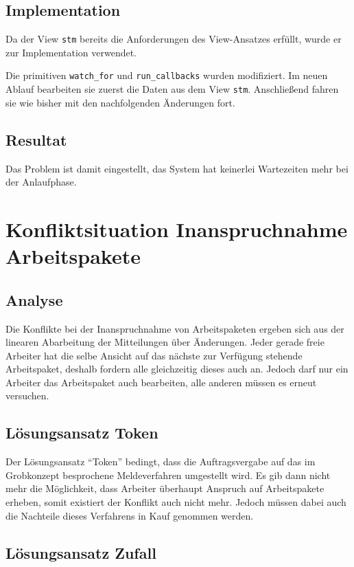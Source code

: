 \subsection{Implementation}
Da der View \verb|stm| bereits die Anforderungen des View-Ansatzes erfüllt,
wurde er zur Implementation verwendet.

Die primitiven \verb|watch_for| und \verb|run_callbacks| wurden modifiziert.
Im neuen Ablauf bearbeiten sie zuerst die Daten aus dem View \verb|stm|.
Anschließend fahren sie wie bisher mit den nachfolgenden Änderungen fort.

\subsection{Resultat}
Das Problem ist damit eingestellt, das System hat keinerlei Wartezeiten mehr bei der Anlaufphase.


\section{Konfliktsituation Inanspruchnahme Arbeitspakete}
\label{cha:opt:conflict-claim}
\subsection{Analyse}
Die Konflikte bei der Inanspruchnahme von Arbeitspaketen ergeben sich aus der linearen Abarbeitung der Mitteilungen über Änderungen.
Jeder gerade freie Arbeiter hat die selbe Ansicht auf das nächste zur Verfügung stehende Arbeitspaket, deshalb fordern alle gleichzeitig dieses auch an.
Jedoch darf nur ein Arbeiter das Arbeitspaket auch bearbeiten,
alle anderen müssen es erneut versuchen.

\subsection{Lösungsansatz Token}
Der Lösungsansatz ``Token'' bedingt, dass die Auftragsvergabe auf das im Grobkonzept besprochene Meldeverfahren umgestellt wird.
Es gib dann nicht mehr die Möglichkeit, dass Arbeiter überhaupt Anspruch auf Arbeitspakete erheben, somit existiert der Konflikt auch nicht mehr.
Jedoch müssen dabei auch die Nachteile dieses Verfahrens in Kauf genommen werden.

\subsection{Lösungsansatz Zufall}

